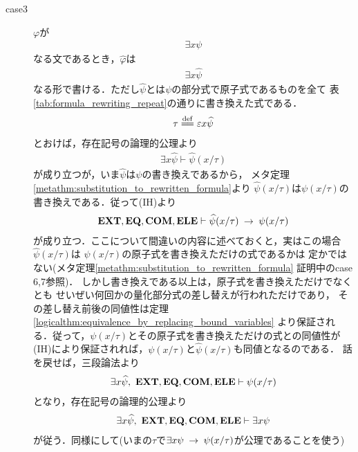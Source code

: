 \begin{sketch}
\begin{description}
\begin{description}
\begin{description}
							\item[case3] $\varphi$が
								\begin{align}
									\exists x \psi
								\end{align}
								なる文であるとき，$\widehat{\varphi}$は
								\begin{align}
									\exists x \widehat{\psi}
								\end{align}
								なる形で書ける．ただし$\widehat{\psi}$とは$\psi$の部分式で原子式であるものを全て
								表\ref{tab:formula_rewriting_repeat}の通りに書き換えた式である．
								\begin{align}
									\tau \defeq \varepsilon x \widehat{\psi}
								\end{align}
								とおけば，存在記号の論理的公理より
								\begin{align}
									\exists x \widehat{\psi} \vdash \widehat{\psi}(x/\tau)
								\end{align}
								が成り立つが，いま$\widehat{\psi}$は$\psi$の書き換えであるから，
								メタ定理\ref{metathm:substitution_to_rewritten_formula}より
								$\widehat{\psi}(x/\tau)$は$\psi(x/\tau)$の書き換えである．従って(IH)より
								\begin{align}
									\mbox{{\bf EXT}},\mbox{{\bf EQ}},\mbox{\bf COM},\mbox{{\bf ELE}} \vdash \widehat{\psi}(x/\tau) \hspace{0.25em}\rightarrow\hspace{0.25em} \psi(x/\tau)
								\end{align}
								が成り立つ．ここについて間違いの内容に述べておくと，実はこの場合$\widehat{\psi}(x/\tau)$は
								$\psi(x/\tau)$の原子式を書き換えただけの式であるかは
								定かではない(メタ定理\ref{metathm:substitution_to_rewritten_formula}
								証明中のcase 6,7参照)．
								しかし書き換えである以上は，原子式を書き換えただけでなくとも
								せいぜい何回かの量化部分式の差し替えが行われただけであり，
								その差し替え前後の同値性は定理\ref{logicalthm:equivalence_by_replacing_bound_variables}
								より保証される．従って，$\psi(x/\tau)$とその原子式を書き換えただけの式との同値性が
								(IH)により保証されれば，$\psi(x/\tau)$と$\widehat{\psi}(x/\tau)$も同値となるのである．
								話を戻せば，三段論法より
								\begin{align}
									\exists x \widehat{\psi},\ \EXTAX,\EQAX,\COMAX,\ELEAX \vdash \psi(x/\tau)
								\end{align}
								となり，存在記号の論理的公理より
								\begin{align}
									\exists x \widehat{\psi},\ \EXTAX,\EQAX,\COMAX,\ELEAX \vdash \exists x \psi
								\end{align}
								が従う．同様にして(いまの$\tau$で$\exists x \psi \hspace{0.25em}\rightarrow\hspace{0.25em} \psi(x/\tau)$が公理であることを使う)

\end{description}
\end{description}
\end{description}
\end{sketch}
